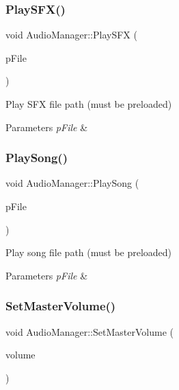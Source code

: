 \subsubsection{\texorpdfstring{Play\+S\+F\+X()}{PlaySFX()}}
{\footnotesize\ttfamily void Audio\+Manager\+::\+Play\+S\+FX (\begin{DoxyParamCaption}\item[{\hyperlink{classStringId}{String\+Id}}]{p\+File }\end{DoxyParamCaption})}



Play S\+FX file path (must be preloaded) 


\begin{DoxyParams}{Parameters}
{\em p\+File} & \\
\hline
\end{DoxyParams}
\mbox{\label{classAudioManager_a50184981af15f336b986cffb5e6c57d3}} 
\subsubsection{\texorpdfstring{Play\+Song()}{PlaySong()}}
{\footnotesize\ttfamily void Audio\+Manager\+::\+Play\+Song (\begin{DoxyParamCaption}\item[{\hyperlink{classStringId}{String\+Id}}]{p\+File }\end{DoxyParamCaption})}



Play song file path (must be preloaded) 


\begin{DoxyParams}{Parameters}
{\em p\+File} & \\
\hline
\end{DoxyParams}
\mbox{\label{classAudioManager_a10dac004e0e76079f6b9b94cdd4a9469}} 
\subsubsection{\texorpdfstring{Set\+Master\+Volume()}{SetMasterVolume()}}
{\footnotesize\ttfamily void Audio\+Manager\+::\+Set\+Master\+Volume (\begin{DoxyParamCaption}\item[{float}]{volume }\end{DoxyParamCaption})}



